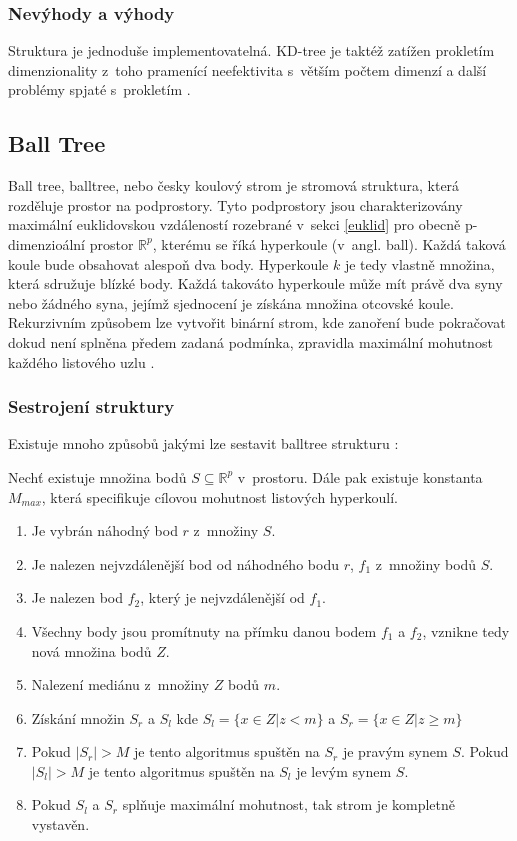 \subsubsection{Nevýhody a výhody}

Struktura je jednoduše implementovatelná. KD-tree je taktéž zatížen prokletím dimenzionality z~toho pramenící neefektivita s~větším počtem dimenzí a další problémy spjaté s~prokletím \cite{kdimensiontree}. 






\subsection*{Ball Tree}
Ball tree, balltree, nebo česky koulový strom je stromová struktura, která rozděluje prostor na podprostory. Tyto podprostory jsou charakterizovány maximální euklidovskou vzdáleností rozebrané v~sekci \ref{euklid} pro obecně p-dimenzioální prostor $\mathbb{R}^p$, kterému se říká hyperkoule (v~angl. ball). Každá taková koule bude obsahovat alespoň dva body. Hyperkoule $k$ je tedy vlastně množina, která sdružuje blízké body. Každá takováto hyperkoule může mít právě dva syny nebo žádného syna, jejímž sjednocení je získána množina otcovské koule. Rekurzivním způsobem lze vytvořit binární strom, kde zanoření bude pokračovat dokud není splněna předem zadaná podmínka, zpravidla maximální mohutnost každého listového uzlu \cite{balltreefive,balltree,originBalltree}.


\subsubsection{Sestrojení struktury}
Existuje mnoho způsobů jakými lze sestavit balltree strukturu \cite{balltreefive,balltree}:

Nechť existuje množina bodů $S \subseteq \mathbb{R}^p$ v~prostoru. Dále pak existuje konstanta $M_{max}$, která specifikuje cílovou mohutnost listových hyperkoulí.

\begin{enumerate}
    \item Je vybrán náhodný bod $r$ z~množiny $S$.
    \item Je nalezen nejvzdálenější bod od náhodného bodu $r$, $f_1$ z~množiny bodů $S$.
    \item Je nalezen bod $f_2$, který je nejvzdálenější od $f_1$.
    \item Všechny body jsou promítnuty na přímku danou bodem $f_1$ a $f_2$, vznikne tedy nová množina bodů $Z$.
    \item Nalezení mediánu z~množiny $Z$ bodů $m$.
    \item Získání množin $S_r$ a $S_l$ kde $S_l = \{x \in Z | z < m \} $ a $S_r = \{x \in Z | z \geq m \}$
    \item Pokud $|S_r| > M$ je tento algoritmus spuštěn na $S_r$ je pravým synem $S$. Pokud $|S_l| > M$ je tento algoritmus spuštěn na $S_l$ je levým synem $S$.
    \item Pokud $S_l$ a $S_r$ splňuje maximální mohutnost, tak strom je kompletně vystavěn.

\end{enumerate}


